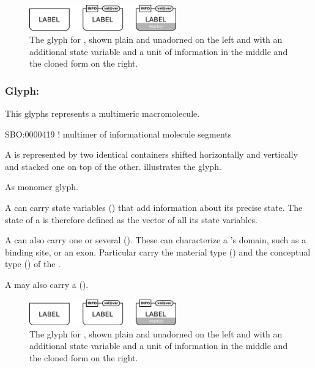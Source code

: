 \begin{figure}[H]
  \centering
  \includegraphics[width = 2.5in]{images/genetic}
  \caption{The \PD glyph for , shown plain and
    unadorned on the left and with an additional state variable and a
    unit of information in the middle and the cloned form on the right.} 
  \label{fig:genetic}
\end{figure}

\subsubsection{Glyph: }

This glyphs represents a multimeric macromolecule.

\begin{glyphDescription}

\glyphSboTerm SBO:0000419 ! multimer of informational molecule segments 

\glyphContainer A  is represented by two identical containers shifted horizontally and vertically and stacked one on top of the other.   illustrates the glyph.

\glyphLabel As monomer glyph.

\glyphAux A  can carry state variables () that add information about its precise state.  The state of a  is therefore defined as the vector of all its state variables. 

A  can also carry one or several  ().  These can characterize a 's domain, such as a binding site, or an exon.  Particular  carry the material type () and the conceptual type () of the . 

A  may also carry a 
().

\end{glyphDescription}

\begin{figure}[H]
  \centering
  \includegraphics[width = 2.5in]{images/genetic}
  \caption{The \PD glyph for , shown plain and
    unadorned on the left and with an additional state variable and a
    unit of information in the middle and the cloned form on the right.} 
  \label{fig:genetic-multimer}
\end{figure}


